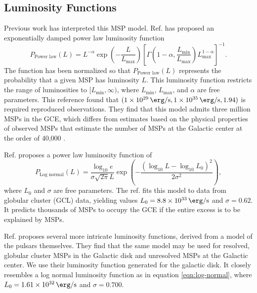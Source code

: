 \documentclass[a4paper,11pt]{article}
\newcommand{\parens}[1]{\left(#1\right)}
\newcommand{\brackets}[1]{\left[#1\right]}
\newcommand{\expp}[1]{\exp \parens{#1}}
\newcommand{\comment}[1]{\emph{\color{red}{#1}}}
\begin{document}
\comment{Just double check that I normalized the power law correctly in parse\_spectrum.py.}

\subsection{Luminosity Functions}
\label{sec:lum-funcs}
Previous work has interpreted this MSP model. Ref. \cite{Zhong:2019ycb} has proposed an exponentially damped power law luminosity function
\begin{equation}
    P_\text{Power law}(L) = L^{-\alpha} \expp{-\frac{L}{L_\text{max}}}\brackets{\Gamma\parens{1-\alpha, \frac{L_\text{min}}{L_\text{max}}}L_\text{max}^{1-\alpha}}^{-1}.
    \label{eqn:power-law}
\end{equation}
The function has been normalized so that $P_\text{Power law}(L)$ represents the probability that a given MSP has luminosity $L$. This luminosity function restricts the range of luminosities to $[L_\text{min}, \infty)$, where $L_\text{min}$, $L_\text{max}$, and $\alpha$ are free parameters. \comment{The following should probably be moved to the introduction, where Fermilab's research is described.} This reference found that $(\SI{1e29}{\erg\per\second}, \SI{1e35}{\erg\per\second}, 1.94)$ is required reproduced observations. They find that this model admits three million MSPs in the GCE, which differs from estimates based on the physical properties of observed MSPs that estimate the number of MSPs at the Galactic center at the order of 40,000 \cite{citation_needed}.

Ref. \cite{osti_1305131} proposes a power law luminosity function of
\begin{equation}
    P_\text{Log normal}(L)= \frac{\log_{10} e}{\sigma \sqrt{2\pi} L}\expp{-\frac{\parens{\log_{10} L - \log_{10} L_0}^2}{2\sigma^2}},
    \label{eqn:log-normal}
\end{equation}
where $L_0$ and $\sigma$ are free parameters. The ref. fits this model to data from globular cluster (GCL) data, yielding values $L_0 = \SI{8.8e33}{\erg\per\second}$ and $\sigma=0.62$. It predicts thousands of MSPs to occupy the GCE if the entire excess is to be explained by MSPs.

Ref. \cite{Ploeg:2020jeh} proposes several more intricate luminosity functions, derived from a model of the pulsars themselves. They find that the same model may be used for resolved, globular cluster MSPs in the Galactic disk and unresolved MSPs at the Galactic center. We use their luminosity function generated for the galactic disk. It closely resembles a log normal luminosity function as in equation \ref{eqn:log-normal}, where $L_0 = \SI{1.61e+32}{\erg\per\second}$ and $\sigma=0.700$.
\end{document}
